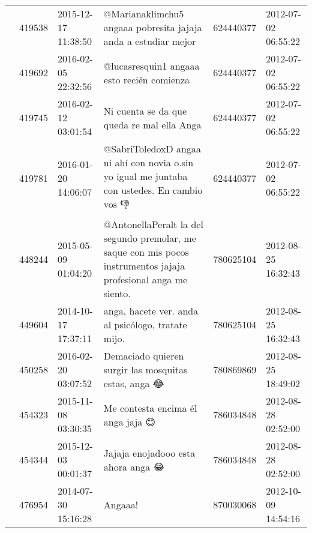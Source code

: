\begin{tabular}{llllrl}
           & 419538  & 2015-12-17 11:38:50 &                                                                               @Marianaklimchu5 angaaa pobresita jajaja anda a estudiar mejor &   624440377 & 2012-07-02 06:55:22 \\
           & 419692  & 2016-02-05 22:32:56 &                                                                                                   @lucasresquin1 angaaa esto recién comienza &   624440377 & 2012-07-02 06:55:22 \\
           & 419745  & 2016-02-12 03:01:54 &                                                                                                   Ni cuenta se da que queda re mal ella Anga &   624440377 & 2012-07-02 06:55:22 \\
           & 419781  & 2016-01-20 14:06:07 &                                                 @SabriToledoxD angaa ni ahí con novia o.sin yo igual me juntaba con ustedes. En cambio vos 👎 &   624440377 & 2012-07-02 06:55:22 \\
           & 448244  & 2015-05-09 01:04:20 &                            @AntonellaPeralt  la del segundo premolar, me saque con mis pocos instrumentos jajaja profesional anga me siento. &   780625104 & 2012-08-25 16:32:43 \\
           & 449604  & 2014-10-17 17:37:11 &                                                                                           anga, hacete ver. anda al psicólogo, tratate mijo. &   780625104 & 2012-08-25 16:32:43 \\
           & 450258  & 2016-02-20 03:07:52 &                                                                                         Demaciado quieren surgir las mosquitas estas, anga 😂 &   780869869 & 2012-08-25 18:49:02 \\
           & 454323  & 2015-11-08 03:30:35 &                                                                                                            Me contesta encima él anga jaja 😊 &   786034848 & 2012-08-28 02:52:00 \\
           & 454344  & 2015-12-03 00:01:37 &                                                                                                           Jajaja enojadooo esta ahora anga 😂 &   786034848 & 2012-08-28 02:52:00 \\
           & 476954  & 2014-07-30 15:16:28 &                                                                                                                                      Angaaa! &   870030068 & 2012-10-09 14:54:16 \\

\end{tabular}
